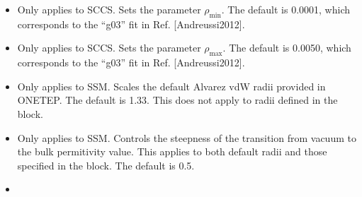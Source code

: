 \documentclass[letterpaper,10pt,english]{sphinxmanual}
\begin{document}
\begin{itemize}
\item {} 
 Only applies to SCCS. Sets the
parameter \(\rho_{\textrm{min}}\). The default is 0.0001, which
corresponds to the “g03” fit in Ref. {[}Andreussi2012{]}.

\item {} 
 Only applies to SCCS. Sets the
parameter \(\rho_{\textrm{max}}\). The default is 0.0050, which
corresponds to the “g03” fit in Ref. {[}Andreussi2012{]}.

\item {} 
 Only applies to SSM. Scales the default
Alvarez vdW radii provided in ONETEP. The default is 1.33. This does
not apply to radii defined in the  block.

\item {} 
 Only applies to SSM. Controls the
steepness of the transition from vacuum to the bulk permitivity
value. This applies to both default radii and those specified in the
 block. The default is 0.5.

\item {} 

\end{itemize}
\end{document}
